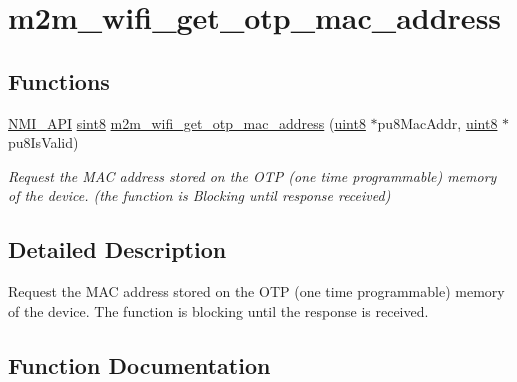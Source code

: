 \hypertarget{group__WifiGetOtpMacAddFn}{}\section{m2m\+\_\+wifi\+\_\+get\+\_\+otp\+\_\+mac\+\_\+address}
\label{group__WifiGetOtpMacAddFn}
\subsection*{Functions}
\begin{DoxyCompactItemize}
\item 
\hyperlink{group__BSPDefine_gaecc0323d771e41ef81a76b5f12783e22}{N\+M\+I\+\_\+\+A\+PI} \hyperlink{group__DataT_gae35f10ffd0ac8dd2bc3e794da9bdfbc7}{sint8} \hyperlink{group__WifiGetOtpMacAddFn_gadb7460d1e0b162decddb7b520e6dbf7b}{m2m\+\_\+wifi\+\_\+get\+\_\+otp\+\_\+mac\+\_\+address} (\hyperlink{group__DataT_ga4df709a77647e870bbf1d955b8edc9a6}{uint8} $\ast$pu8\+Mac\+Addr, \hyperlink{group__DataT_ga4df709a77647e870bbf1d955b8edc9a6}{uint8} $\ast$pu8\+Is\+Valid)
\begin{DoxyCompactList}\small\item\em Request the M\+AC address stored on the O\+TP (one time programmable) memory of the device. (the function is Blocking until response received) \end{DoxyCompactList}\end{DoxyCompactItemize}


\subsection{Detailed Description}
Request the M\+AC address stored on the O\+TP (one time programmable) memory of the device. The function is blocking until the response is received. 

\subsection{Function Documentation}
\mbox{\label{group__WifiGetOtpMacAddFn_gadb7460d1e0b162decddb7b520e6dbf7b}} 
